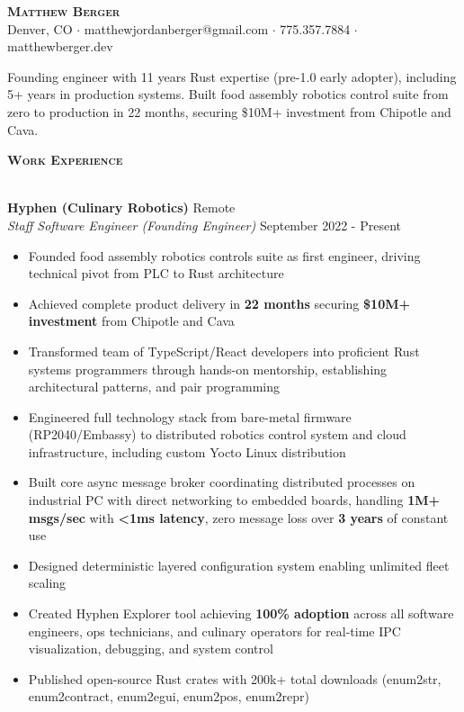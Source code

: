 \documentclass[a4paper]{article}
\newcommand{\lineunder} {
    \vspace*{-8pt} \\
    \hspace*{-18pt} \hrulefill \\
}
\newcommand{\header} [1] {
    {\hspace*{-18pt}\vspace*{6pt} \large \textbf{\textsc{#1}}}
    \vspace*{-6pt} \lineunder
    \vspace*{4pt}
}
\begin{document}
\vspace*{-40pt}

\begin{center}
    {\Huge \scshape \textbf{Matthew Berger}}\\
    \vspace*{4pt}
    Denver, CO $\cdot$ matthewjordanberger@gmail.com $\cdot$ 775.357.7884 $\cdot$ matthewberger.dev\\
\end{center}

\vspace*{-6pt}
Founding engineer with 11 years Rust expertise (pre-1.0 early adopter), including 5+ years in production systems. Built food assembly robotics control suite from zero to production in 22 months, securing \$10M+ investment from Chipotle and Cava.
\vspace*{8pt}

\header{Work Experience}

\textbf{Hyphen (Culinary Robotics)} \hfill Remote\\
\textit{Staff Software Engineer (Founding Engineer)} \hfill September 2022 - Present\\
\vspace{-1mm}
\begin{itemize} \itemsep 1pt
    \item Founded food assembly robotics controls suite as first engineer, driving technical pivot from PLC to Rust architecture
    \item Achieved complete product delivery in \textbf{22 months} securing \textbf{\$10M+ investment} from Chipotle and Cava
    \item Transformed team of TypeScript/React developers into proficient Rust systems programmers through hands-on mentorship, establishing architectural patterns, and pair programming
    \item Engineered full technology stack from bare-metal firmware (RP2040/Embassy) to distributed robotics control system and cloud infrastructure, including custom Yocto Linux distribution
    \item Built core async message broker coordinating distributed processes on industrial PC with direct networking to embedded boards, handling \textbf{1M+ msgs/sec} with \textbf{<1ms latency}, zero message loss over \textbf{3 years} of constant use
    \item Designed deterministic layered configuration system enabling unlimited fleet scaling
    \item Created Hyphen Explorer tool achieving \textbf{100\% adoption} across all software engineers, ops technicians, and culinary operators for real-time IPC visualization, debugging, and system control
    \item Published open-source Rust crates with 200k+ total downloads (enum2str, enum2contract, enum2egui, enum2pos, enum2repr)
\end{itemize}
\end{document}
